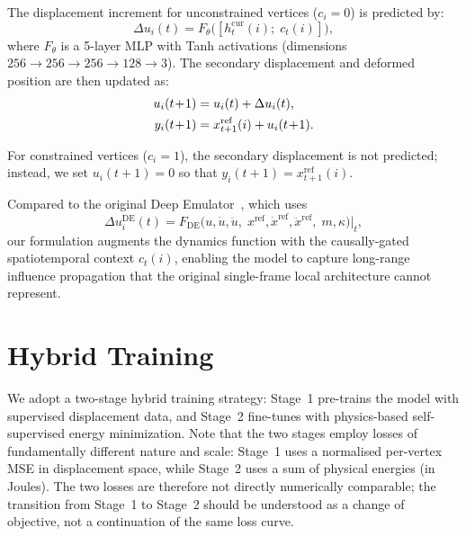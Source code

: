 \documentclass[10pt,twocolumn]{article}
\begin{document}
The displacement increment for unconstrained vertices ($c_i = 0$) is predicted by:
\begin{equation}\label{eq:dynamics}
    \Delta u_i(t) = F_\theta\!\big([h_t^{\mathrm{cur}}(i);\; c_t(i)]\big),
\end{equation}
where $F_\theta$ is a 5-layer MLP with Tanh activations (dimensions $256 \to 256 \to 256 \to 128 \to 3$). The secondary displacement and deformed position are then updated as:
\begin{align}\label{eq:update}
    u_i(t\!+\!1) &= u_i(t) + \Delta u_i(t), \notag\\
    y_i(t\!+\!1) &= x^{\mathrm{ref}}_{t+1}(i) + u_i(t\!+\!1).
\end{align}

For constrained vertices ($c_i = 1$), the secondary displacement is not predicted; instead, we set $u_i(t+1) = 0$ so that $y_i(t+1) = x^{\mathrm{ref}}_{t+1}(i)$.

Compared to the original Deep Emulator~\cite{zheng2021deep}, which uses
\begin{equation}
    \Delta u_i^{\mathrm{DE}}(t) = F_{\mathrm{DE}}\!\big(u, \dot{u}, \ddot{u},\;
    x^{\mathrm{ref}}, \dot{x}^{\mathrm{ref}}, \ddot{x}^{\mathrm{ref}},\;
    m, \kappa\big)\big|_{t},
\end{equation}
our formulation augments the dynamics function with the causally-gated spatiotemporal context $c_t(i)$, enabling the model to capture long-range influence propagation that the original single-frame local architecture cannot represent.

\section{Hybrid Training}

We adopt a two-stage hybrid training strategy: Stage~1 pre-trains the model with supervised displacement data, and Stage~2 fine-tunes with physics-based self-supervised energy minimization. Note that the two stages employ losses of fundamentally different nature and scale: Stage~1 uses a normalised per-vertex MSE in displacement space, while Stage~2 uses a sum of physical energies (in Joules). The two losses are therefore not directly numerically comparable; the transition from Stage~1 to Stage~2 should be understood as a change of objective, not a continuation of the same loss curve.
\end{document}
